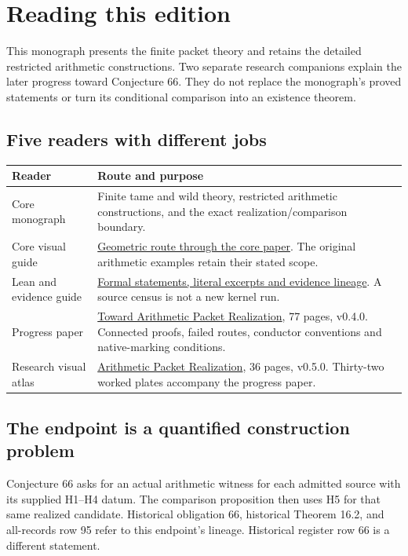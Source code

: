 \begingroup\raggedright
\section*{Reading this edition}
{}
This monograph presents the finite packet theory and retains the detailed restricted arithmetic constructions. Two separate research companions explain the later progress toward Conjecture 66. They do not replace the monograph's proved statements or turn its conditional comparison into an existence theorem.

\subsection*{Five readers with different jobs}
\begin{tabular}{@{}>{\raggedright\arraybackslash}p{.28\linewidth}>{\raggedright\arraybackslash}p{.67\linewidth}@{}}\toprule
Reader & Route and purpose\\\midrule
Core monograph & Finite tame and wild theory, restricted arithmetic constructions, and the exact realization/comparison boundary.\\[7pt]
Core visual guide & \href{https://komorebi.invalid/b07/core_visual}{Geometric route through the core paper}. The original arithmetic examples retain their stated scope.\\[7pt]
Lean and evidence guide & \href{https://komorebi.invalid/b07/core_lean}{Formal statements, literal excerpts and evidence lineage}. A source census is not a new kernel run.\\[7pt]
Progress paper & \href{https://komorebi.invalid/b07/research_start}{Toward Arithmetic Packet Realization}, 77 pages, v0.4.0. Connected proofs, failed routes, conductor conventions and native-marking conditions.\\[7pt]
Research visual atlas & \href{https://komorebi.invalid/b07/atlas_start}{Arithmetic Packet Realization}, 36 pages, v0.5.0. Thirty-two worked plates accompany the progress paper.\\\bottomrule
\end{tabular}

\subsection*{The endpoint is a quantified construction problem}
Conjecture 66 asks for an actual arithmetic witness for each admitted source with its supplied H1--H4 datum. The comparison proposition then uses H5 for that same realized candidate. Historical obligation 66, historical Theorem 16.2, and all-records row 95 refer to this endpoint's lineage. Historical register row 66 is a different statement.

